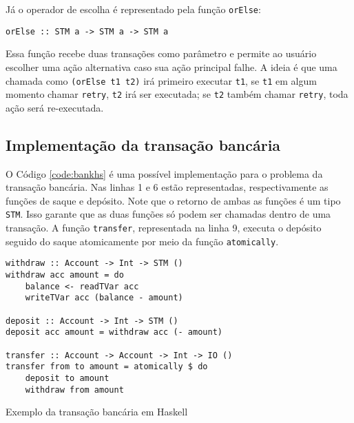 Já o operador de escolha é representado pela função \verb|orElse|:
\begin{verbatim}
orElse :: STM a -> STM a -> STM a
\end{verbatim}

Essa função recebe duas transações como parâmetro e permite ao usuário escolher uma ação alternativa caso sua ação principal falhe. A ideia é que uma chamada como \verb|(orElse t1 t2)| irá primeiro executar \verb|t1|, se \verb|t1| em algum momento chamar \verb|retry|, \verb|t2| irá ser executada; se \verb|t2| também chamar \verb|retry|, toda ação será re-executada.


\subsection{Implementação da transação bancária}

O Código \ref{code:bankhs} é uma possível implementação para o problema da transação bancária. Nas linhas 1 e 6 estão representadas, respectivamente as funções de saque e depósito. Note que o retorno de ambas as funções é um tipo \verb|STM|. Isso garante que as duas funções só podem ser chamadas dentro de uma transação. A função \verb|transfer|, representada na linha 9, executa o depósito seguido do saque atomicamente por meio da função \verb|atomically|.

\begin{listing}
  \begin{verbatim}
withdraw :: Account -> Int -> STM ()
withdraw acc amount = do
    balance <- readTVar acc
    writeTVar acc (balance - amount)

deposit :: Account -> Int -> STM ()
deposit acc amount = withdraw acc (- amount)

transfer :: Account -> Account -> Int -> IO ()
transfer from to amount = atomically $ do
    deposit to amount
    withdraw from amount
  \end{verbatim}
  \caption{Exemplo da transação bancária em Haskell}
  \label{code:bankhs}
\end{listing}
